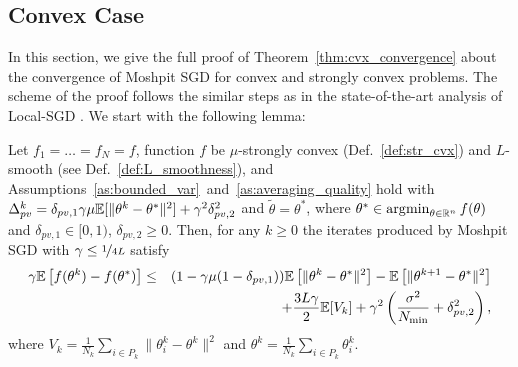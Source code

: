 \subsection{Convex Case}
In this section, we give the full proof of Theorem~\ref{thm:cvx_convergence} about the convergence of Moshpit SGD for convex and strongly convex problems. The scheme of the proof follows the similar steps as in the state-of-the-art analysis of Local-SGD \cite{khaled2020tighter,woodworth2020local,gorbunov2020local}. We start with the following lemma:
\begin{lemma}\label{lem:key_lemma_cvx}
    Let $f_1 = \ldots = f_N = f$, function $f$ be $\mu$-strongly convex (Def.~\ref{def:str_cvx}) and $L$-smooth (see Def.~\ref{def:L_smoothness}), and Assumptions~\ref{as:bounded_var}~and~\ref{as:averaging_quality} hold with $\Delta_{pv}^k = \delta_{pv,1}\gamma\mu\mathbb{E}[\|\theta^k-\theta^*\|^2] + \gamma^2\delta_{pv,2}^2$ and $\widetilde{\theta} = \theta^*$, where $\theta^* \in \mathop{\arg\!\min}_{\theta\in\mathbb{R}^n} f(\theta)$ and $\delta_{pv,1}\in [0,1)$, $\delta_{pv,2}\ge 0$. Then, for any $k \ge 0$ the iterates produced by Moshpit SGD with $\gamma \le \nicefrac{1}{4L}$ satisfy
    \begin{eqnarray}
        \gamma\mathbb{E}\left[f(\theta^k) - f(\theta^*)\right] &\le& (1-\gamma\mu(1-\delta_{pv,1}))\mathbb{E}\left[\|\theta^k - \theta^*\|^2\right] - \mathbb{E}\left[\|\theta^{k+1} - \theta^*\|^2\right]\notag\\
        &&\quad+ \frac{3L\gamma}{2}\mathbb{E}[V_k] + \gamma^2\left(\frac{\sigma^2}{N_{\min}} + \delta_{pv,2}^2\right),\label{eq:key_lemma_cvx}
    \end{eqnarray}
    where $V_k = \frac{1}{N_k}\sum_{i\in P_k}\|\theta_i^k - \theta^k\|^2$ and $\theta^k = \frac{1}{N_k}\sum_{i\in P_k}\theta_i^k$.
\end{lemma}
